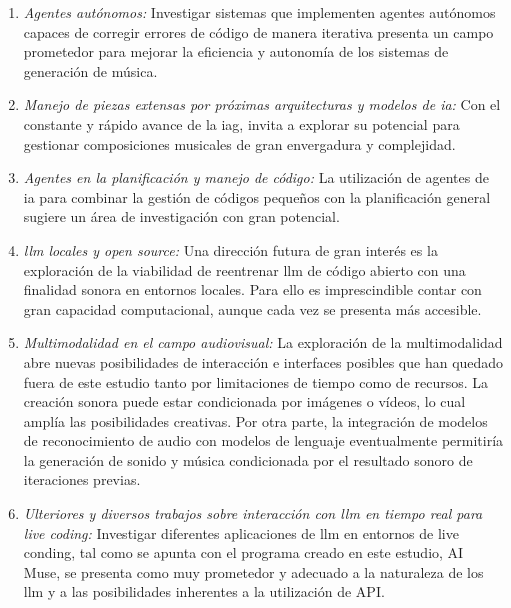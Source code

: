 \begin{enumerate}
\item \textit{Agentes autónomos:} Investigar sistemas que implementen agentes autónomos capaces de corregir errores de código de manera iterativa presenta un campo prometedor para mejorar la eficiencia y autonomía de los sistemas de generación de música.

\item \textit{Manejo de piezas extensas por próximas arquitecturas y modelos de \gls{ia}:} Con el constante y rápido avance de la \gls{iag},  invita a explorar su potencial para gestionar composiciones musicales de gran envergadura y complejidad.

\item \textit{Agentes en la planificación y manejo de código:} La utilización de agentes de \gls{ia} para combinar la gestión de códigos pequeños con la planificación general sugiere un área de investigación con gran potencial.

\item \textit{\gls{llm} locales y open source:} Una dirección futura de gran interés es la exploración de la viabilidad de reentrenar \gls{llm} de código abierto con una finalidad sonora en entornos locales. Para ello es imprescindible contar con gran capacidad computacional, aunque cada vez se presenta más accesible.

\item \textit{Multimodalidad en el campo audiovisual:} La exploración de la multimodalidad abre nuevas posibilidades de interacción e interfaces posibles que han quedado fuera de este estudio tanto por limitaciones de tiempo como de recursos. La creación sonora puede estar condicionada por imágenes o vídeos, lo cual amplía las posibilidades creativas. Por otra parte, la integración de modelos de reconocimiento de audio con modelos de lenguaje eventualmente permitiría la generación de sonido y música condicionada por el resultado sonoro de iteraciones previas.

\item \textit{Ulteriores y diversos trabajos sobre interacción con \gls{llm} en tiempo real para live coding:} Investigar diferentes aplicaciones de \gls{llm} en entornos de live conding, tal como se apunta con el programa creado en este estudio, AI Muse, se presenta como muy prometedor y adecuado a la naturaleza de los \gls{llm} y a las posibilidades inherentes a la utilización de API.

\end{enumerate}
